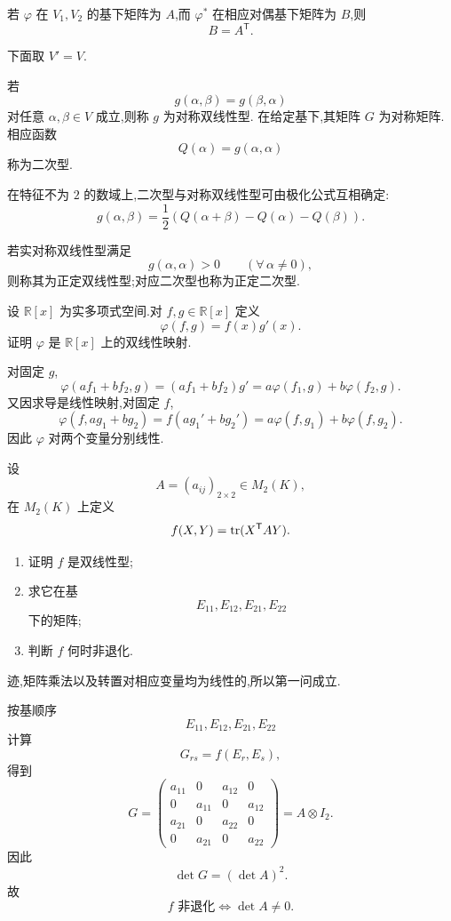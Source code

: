 \begin{theorem}[\markstar]
若 $\varphi$ 在 $V_1,V_2$ 的基下矩阵为 $A$,而
$\varphi^*$ 在相应对偶基下矩阵为 $B$,则
\[
\boxed{B=A^{\mathsf T}}.
\]
\end{theorem}

下面取 $V'=V$.

\begin{definition}
若
\[
g(\alpha,\beta)=g(\beta,\alpha)
\]
对任意 $\alpha,\beta\in V$ 成立,则称 $g$ 为对称双线性型.
在给定基下,其矩阵 $G$ 为对称矩阵.相应函数
\[
Q(\alpha)=g(\alpha,\alpha)
\]
称为二次型.
\end{definition}

在特征不为 $2$ 的数域上,二次型与对称双线性型可由极化公式互相确定:
\[
g(\alpha,\beta)
=
\dfrac12
\left(
Q(\alpha+\beta)-Q(\alpha)-Q(\beta)
\right).
\]

若实对称双线性型满足
\[
g(\alpha,\alpha)>0
\qquad
(\forall\,\alpha\neq0),
\]
则称其为正定双线性型;对应二次型也称为正定二次型.


\begin{example}
设 $\mathbb{R}[x]$ 为实多项式空间.对 $f,g\in\mathbb{R}[x]$ 定义
\[
\varphi(f,g)=f(x)g'(x).
\]
证明 $\varphi$ 是 $\mathbb{R}[x]$ 上的双线性映射.
\end{example}
\exampleblank

\begin{solution}
对固定 $g$,
\[
\varphi(af_1+bf_2,g)
=
(af_1+bf_2)g'
=
a\varphi(f_1,g)+b\varphi(f_2,g).
\]
又因求导是线性映射,对固定 $f$,
\[
\varphi(f,ag_1+bg_2)
=
f(ag_1'+bg_2')
=
a\varphi(f,g_1)+b\varphi(f,g_2).
\]
因此 $\varphi$ 对两个变量分别线性.
\end{solution}


\begin{example}
设
\[
A=(a_{ij})_{2\times2}\in M_2(K),
\]
在 $M_2(K)$ 上定义
\[
f(X,Y)=\operatorname{tr}(X^{\mathsf T}AY).
\]
\begin{enumerate}
    \item 证明 $f$ 是双线性型;
    \item 求它在基
    \[
    E_{11},E_{12},E_{21},E_{22}
    \]
    下的矩阵;
    \item 判断 $f$ 何时非退化.
\end{enumerate}
\end{example}
\exampleblank

\begin{solution}
迹,矩阵乘法以及转置对相应变量均为线性的,所以第一问成立.

按基顺序
\[
E_{11},E_{12},E_{21},E_{22}
\]
计算
\[
G_{rs}=f(E_r,E_s),
\]
得到
\[
\boxed{
G=
\begin{pmatrix}
a_{11}&0&a_{12}&0\\
0&a_{11}&0&a_{12}\\
a_{21}&0&a_{22}&0\\
0&a_{21}&0&a_{22}
\end{pmatrix}
=
A\otimes I_2.
}
\]
因此
\[
\det G=(\det A)^2.
\]
故
\[
\boxed{f\text{ 非退化}\iff \det A\neq0.}
\]
\end{solution}


